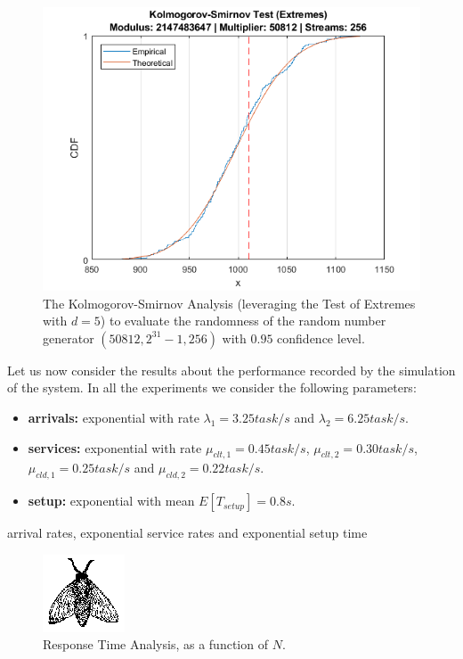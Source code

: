 \begin{figure}
	\label{fig:evaluation-randomness-kolmogorov-smirnov-50812}
	\includegraphics[width=\columnwidth]{fig/evaluation-randomness-kolmogorov-smirnov-50812}
	\caption{The Kolmogorov-Smirnov Analysis (leveraging the Test of Extremes with $d=5$) to evaluate the randomness of the random number generator $(50812,2^{31}-1, 256)$ with $0.95$ confidence level.}
\end{figure}


Let us now consider the results about the performance recorded by the simulation of the system.
In all the experiments we consider the following parameters:

\begin{itemize}
	\item \textbf{arrivals:} exponential with rate $\lambda_{1}=3.25 task/s$ and $\lambda_{2}=6.25 task/s$.
	\item \textbf{services:} exponential with rate $\mu_{clt,1} = 0.45 task/s$, $\mu_{clt,2} = 0.30 task/s$, $\mu_{cld,1} = 0.25 task/s$ and $\mu_{cld,2} = 0.22 task/s$.
	\item \textbf{setup:} exponential with mean $E[T_{setup}]=0.8s$.
\end{itemize}

arrival rates, exponential service rates and exponential setup time

\begin{figure}
  \label{fig:evaluation-response-time}
  \includegraphics{fig/fly}
  \caption{Response Time Analysis, as a function of $N$.}
\end{figure}

